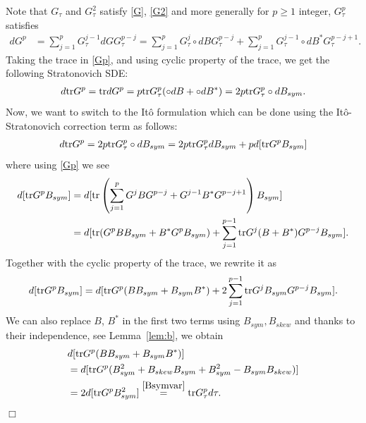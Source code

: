 \documentclass[english, letterpaper,12pt,reqno]{amsart}
\theoremstyle{remark}
\renewenvironment{proof}[1][Proof]{ {\itshape \noindent {#1.}} }{$\Box$
\medskip}
\theoremstyle{plain}
\newcommand{\1}{\mathbf{1}}
\def\tr{{\rm tr}}
\begin{document}
\begin{proof}[Proof of Lemma~\ref{lem:odes}]
    Note that $G_\tau$ and $G^2_\tau$ satisfy \eqref{G}, \eqref{G2} and more generally for $p\geq 1$ integer, $G_\tau^p$ satisfies 
    \begin{align}
    dG^p&=\sum_{j=1}^p G_\tau^{j-1}dGG_\tau^{p-j}=\sum_{j=1}^p G_\tau^{j}\circ dB G_\tau^{p-j}+\sum_{j=1}^p G_\tau^{j-1} \circ dB^* G_\tau^{p-j+1} . \label{Gp}
\end{align}
%
Taking the trace in \eqref{Gp}, and using cyclic property of the trace, we get the following Stratonovich SDE: 
%
\begin{align*}
    d \tr G^p=\tr  dG^p=p\tr G_\tau^p(\circ dB+\circ dB^*)=2p\tr G_\tau^p\circ dB_{{sym}}.
\end{align*}
%
Now, we want to switch to the Itô formulation which can be done using the Itô-Stratonovich correction term as follows: 
%
\begin{align}\label{TrGpst-ito}
    d \tr G^p=2p \tr G_\tau^p\circ dB_{{sym}}=2p\tr  G_\tau^p dB_{{sym}}+p d[\tr G^pB_{{sym}}]
\end{align}
%
where using \eqref{Gp} we see 
\begin{align*}\begin{aligned}
    d[\tr  G^pB_{sym}]&=d[\tr \left(\sum_{j=1}^p G^j B G^{p-j}+G^{j-1} B^*G^{p-j+1}\right)B_{sym}]\\ &=d[\tr (G^p B B_{ sym}+B^*G^p B_{sym}) +\sum_{j=1}^{p-1} \tr G^j (B+B^*)G^{p-j}B_{ sym}].
  \end{aligned}
\end{align*}
%
Together with the cyclic property of the trace, we rewrite it
as 
%
\begin{align}\begin{aligned}
    d[\tr  G^pB_{sym}]=d[\tr G^p( BB_{sym}+ B_{sym}B^*) +2\sum_{j=1}^{p-1} \tr G^j B_{sym}G^{p-j}B_{ sym}].\end{aligned} \label{qvgp}
\end{align}
%
 We can also replace $B$, $B^*$ in the first two terms using $B_{sym},B_{skew}$ and thanks to their independence, see Lemma~\ref{lem:b}, we obtain
 \begin{align}
\begin{aligned}
    &d[\tr G^p (BB_{ sym}+B_{sym}B^*)]\\&= d[\tr G^p (B_{ sym}^2+B_{skew}B_{sym}+B_{sym}^2- B_{sym}B_{skew})]\\
  & = 2 d[\tr G^p B^2_{ sym}]\overset{\eqref{Bsymvar}}{=}\tr G_\tau^p d\tau. \end{aligned}   \label{indep}

\end{align}
\end{proof}
\end{document}
